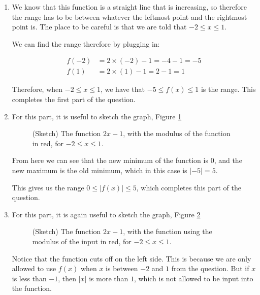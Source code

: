 \begin{solution}

    \begin{enumerate}
        \item 
    We know that this function is a straight line that is increasing, so therefore the range has to be between whatever the leftmost point and the rightmost point is. The place to be careful is that 
    we are told that $-2\leq x \leq 1$.
     
    We can find the range therefore by plugging in:

    \begin{align*}
        f(-2) &= 2\times(-2) - 1 = -4 -1 = -5\\
        f(1) &= 2\times(1) -1= 2 -1 = 1
    \end{align*}

    Therefore, when $-2\leq x \leq 1$, we have that $-5 \leq f(x) \leq 1$ is the range. This completes the first part of the question.
        \item
    For this part, it is useful to sketch the graph, Figure \ref{fig:line-for-modulus}

    \begin{figure}[H]
    \centering
    \caption{(Sketch) The function $2x - 1$, with the modulus of the function in red, for $-2 \leq x \leq 1$.}
    \label{fig:line-for-modulus}
    \end{figure}

    From here we can see that the new minimum of the function is $0$, and the new maximum is the old minimum, which in this case is $|-5|= 5$.

    This gives us the range $0 \leq |f(x)| \leq 5$, which completes this part of the question.

    \item 
    For this part, it is again useful to sketch the graph, Figure \ref{fig:modxline-for-modulus}

    \begin{figure}[H]
    \centering
    \caption{(Sketch) The function $2x - 1$, with the function using the modulus of the input in red, for $-2 \leq x \leq 1$.}
    \label{fig:modxline-for-modulus}
    \end{figure}
    
    Notice that the function cuts off on the left side. This is because we are only allowed to use $f(x)$ when $x$ is between $-2$ and $1$ from the question. But if $x$ is less than $-1$, then $|x|$ is more than $1$, which is not allowed to be input into the function.
    

\end{enumerate}
\end{solution}
